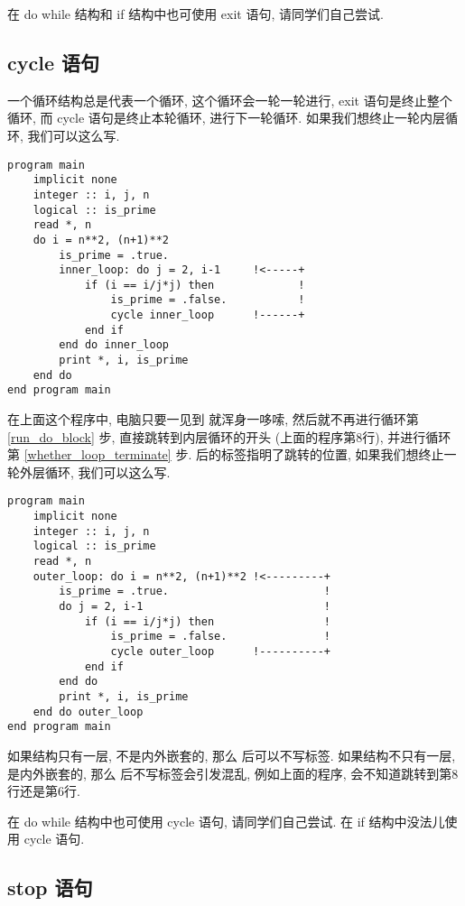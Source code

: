 在 do while 结构和 if 结构中也可使用 exit 语句, 请同学们自己尝试.

\subsection{cycle 语句}\label{fortran_cycle}

一个循环结构总是代表一个循环, 这个循环会一轮一轮进行, exit 语句是终止整个循环, 而 cycle 语句是终止本轮循环, 进行下一轮循环. 如果我们想终止一轮内层循环, 我们可以这么写.
\begin{lstlisting}
program main
    implicit none
    integer :: i, j, n
    logical :: is_prime
    read *, n
    do i = n**2, (n+1)**2
        is_prime = .true.
        inner_loop: do j = 2, i-1     !<-----+
            if (i == i/j*j) then             !
                is_prime = .false.           !
                cycle inner_loop      !------+
            end if
        end do inner_loop
        print *, i, is_prime
    end do
end program main
\end{lstlisting}
在上面这个程序中, 电脑只要一见到  就浑身一哆嗦, 然后就不再进行循环第 \ref{run_do_block} 步, 直接跳转到内层循环的开头 (上面的程序第8行), 并进行循环第 \ref{whether_loop_terminate} 步.  后的标签指明了跳转的位置, 如果我们想终止一轮外层循环, 我们可以这么写.
\begin{lstlisting}
program main
    implicit none
    integer :: i, j, n
    logical :: is_prime
    read *, n
    outer_loop: do i = n**2, (n+1)**2 !<---------+
        is_prime = .true.                        !
        do j = 2, i-1                            !
            if (i == i/j*j) then                 !
                is_prime = .false.               !
                cycle outer_loop      !----------+
            end if
        end do
        print *, i, is_prime
    end do outer_loop
end program main
\end{lstlisting}

如果结构只有一层, 不是内外嵌套的, 那么  后可以不写标签. 如果结构不只有一层, 是内外嵌套的, 那么  后不写标签会引发混乱, 例如上面的程序, 会不知道跳转到第8行还是第6行.

在 do while 结构中也可使用 cycle 语句, 请同学们自己尝试. 在 if 结构中没法儿使用 cycle 语句.

\subsection{stop 语句}

